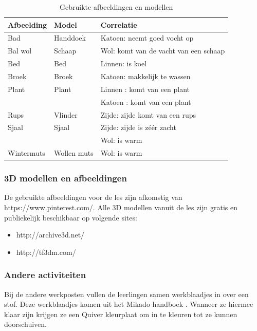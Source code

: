 \documentclass[pdftex,a4paper,12pt,twoside]{report}
\begin{document}
\begin{table}[h]
\begin{center}
\label{table:models}
\caption{Gebruikte afbeeldingen en modellen}
\vspace{5pt}
\begin{tabular}{l | l | l}
Afbeelding & Model & Correlatie \\
\hline
Bad & Handdoek & Katoen: neemt goed vocht op \\
Bal wol & Schaap & Wol: komt van de vacht van een schaap\\
Bed & Bed & Linnen: is koel \\
Broek & Broek & Katoen: makkelijk te wassen \\
Plant & Plant & Linnen : komt van een plant \\
      &       & Katoen : komt van een plant \\
Rups & Vlinder & Zijde: zijde komt van een rups \\
Sjaal & Sjaal & Zijde: zijde is zéér zacht \\
 &  &  Wol: is warm \\
Wintermuts & Wollen muts & Wol: is warm \\
\end{tabular}
\end{center}
\end{table}

\subsubsection{3D modellen en afbeeldingen}

De gebruikte afbeeldingen voor de les zijn afkomstig van https://www.pinterest.com/. Alle 3D modellen vanuit de les zijn gratis en publiekelijk beschikbaar op volgende sites:
\begin{itemize}
\item http://archive3d.net/
\item http://tf3dm.com/
\end{itemize}

\subsubsection{Andere activiteiten}
Bij de andere werkposten vullen de leerlingen samen werkblaadjes in over een stof. Deze werkblaadjes komen uit het Mikado handboek \citep{mikado}. Wanneer ze hiermee klaar zijn krijgen ze een Quiver kleurplaat om in te kleuren tot ze kunnen doorschuiven.
\end{document}
